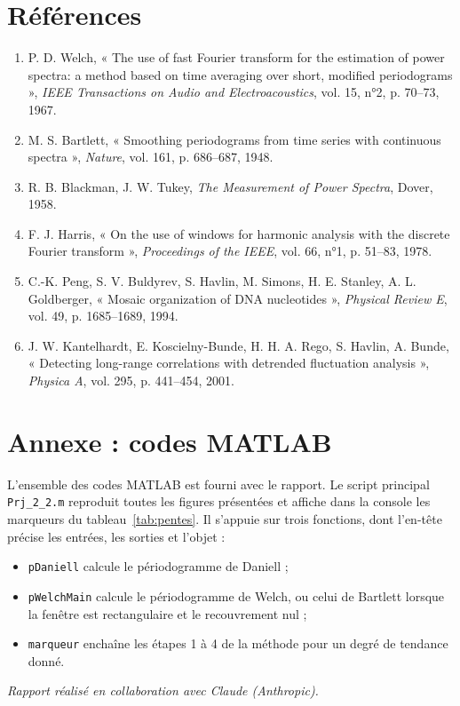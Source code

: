 \documentclass[11pt,a4paper]{article}
\begin{document}
\section*{Références}

\begin{enumerate}
  \renewcommand{\labelenumi}{[\arabic{enumi}]}
  \item P. D. Welch, « The use of fast Fourier transform for the estimation of power spectra: a method based on time averaging over short, modified periodograms », \emph{IEEE Transactions on Audio and Electroacoustics}, vol. 15, n°2, p. 70--73, 1967.
  \item M. S. Bartlett, « Smoothing periodograms from time series with continuous spectra », \emph{Nature}, vol. 161, p. 686--687, 1948.
  \item R. B. Blackman, J. W. Tukey, \emph{The Measurement of Power Spectra}, Dover, 1958.
  \item F. J. Harris, « On the use of windows for harmonic analysis with the discrete Fourier transform », \emph{Proceedings of the IEEE}, vol. 66, n°1, p. 51--83, 1978.
  \item C.-K. Peng, S. V. Buldyrev, S. Havlin, M. Simons, H. E. Stanley, A. L. Goldberger, « Mosaic organization of DNA nucleotides », \emph{Physical Review E}, vol. 49, p. 1685--1689, 1994.
  \item J. W. Kantelhardt, E. Koscielny-Bunde, H. H. A. Rego, S. Havlin, A. Bunde, « Detecting long-range correlations with detrended fluctuation analysis », \emph{Physica A}, vol. 295, p. 441--454, 2001.
\end{enumerate}

\section*{Annexe : codes MATLAB}

L'ensemble des codes MATLAB est fourni avec le rapport. Le script principal \texttt{Prj\_2\_2.m} reproduit toutes les figures présentées et affiche dans la console les marqueurs du tableau~\ref{tab:pentes}. Il s'appuie sur trois fonctions, dont l'en-tête précise les entrées, les sorties et l'objet :
\begin{itemize}
  \item \texttt{pDaniell} calcule le périodogramme de Daniell ;
  \item \texttt{pWelchMain} calcule le périodogramme de Welch, ou celui de Bartlett lorsque la fenêtre est rectangulaire et le recouvrement nul ;
  \item \texttt{marqueur} enchaîne les étapes 1 à 4 de la méthode pour un degré de tendance donné.
\end{itemize}

\vfill
\noindent\textit{Rapport réalisé en collaboration avec Claude (Anthropic).}
\end{document}
